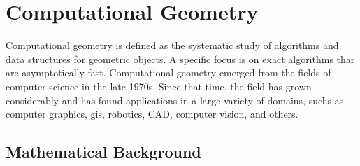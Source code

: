 
\chapter{Computational Geometry}

Computational geometry is defined as the systematic study of algorithms and data structures for geometric objects.
A specific focus is on exact algorithms thar are asymptotically fast.
Computational geometry emerged from the fields of computer science in the late 1970s.
Since that time, the field has grown considerably and has found applications in a large variety of domains, suchs as computer graphics, \gls{gis}, robotics, \gls{CAD}, computer vision, and others.

\section{Mathematical Background}

